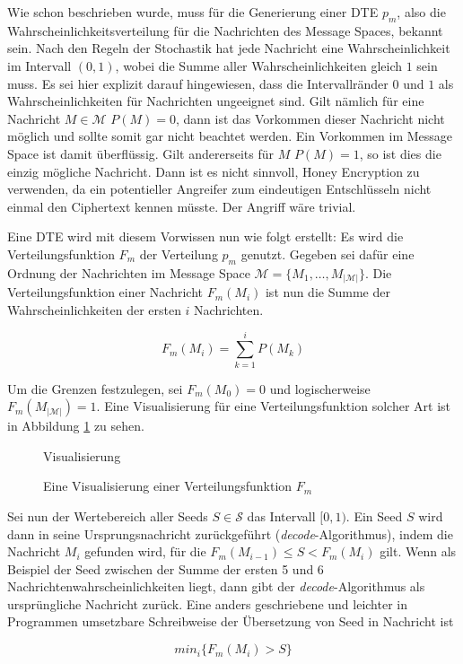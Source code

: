 Wie schon beschrieben wurde, muss für die Generierung einer DTE $p_m$, also die Wahrscheinlichkeitsverteilung für die Nachrichten des Message Spaces, bekannt sein. Nach den Regeln der Stochastik hat jede Nachricht eine Wahrscheinlichkeit im Intervall $(0,1)$, wobei die Summe aller Wahrscheinlichkeiten gleich $1$ sein muss. Es sei hier explizit darauf hingewiesen, dass die Intervallränder $0$ und $1$ als Wahrscheinlichkeiten für Nachrichten ungeeignet sind. Gilt nämlich für eine Nachricht $M \in \mathcal{M}$ $P(M) = 0$, dann ist das Vorkommen dieser Nachricht nicht möglich und sollte somit gar nicht beachtet werden. Ein Vorkommen im Message Space ist damit überflüssig. Gilt andererseits für $M$ $P(M) = 1$, so ist dies die einzig mögliche Nachricht. Dann ist es nicht sinnvoll, Honey Encryption zu verwenden, da ein potentieller Angreifer zum eindeutigen Entschlüsseln nicht einmal den Ciphertext kennen müsste. Der Angriff wäre trivial.

Eine DTE wird mit diesem Vorwissen nun wie folgt erstellt: Es wird die Verteilungsfunktion $F_m$ der Verteilung $p_m$ genutzt. Gegeben sei dafür eine Ordnung der Nachrichten im Message Space $\mathcal{M} = \{M_1, \dots, M_{|\mathcal{M}|}\}$. Die Verteilungsfunktion einer Nachricht $F_m(M_i)$ ist nun die Summe der Wahrscheinlichkeiten der ersten $i$ Nachrichten.

$$F_m(M_i) = \sum_{k = 1}^{i} P(M_k)$$

Um die Grenzen festzulegen, sei $F_m(M_0) = 0$ und logischerweise $F_m(M_{|\mathcal{M}|}) = 1$. Eine Visualisierung für eine Verteilungsfunktion solcher Art ist in Abbildung \ref{fig:Verteilungsfunktion} zu sehen.

\begin{figure}[!h]
Visualisierung
\caption{Eine Visualisierung einer Verteilungsfunktion $F_m$}
\label{fig:Verteilungsfunktion}
\end{figure}

Sei nun der Wertebereich aller Seeds $S \in \mathcal{S}$ das Intervall $[0,1)$. Ein Seed $S$ wird dann in seine Ursprungsnachricht zurückgeführt (\emph{decode}-Algorithmus), indem die Nachricht $M_i$ gefunden wird, für die $F_m(M_{i-1}) \leq S < F_m(M_i)$ gilt. Wenn als Beispiel der Seed zwischen der Summe der ersten 5 und 6 Nachrichtenwahrscheinlichkeiten liegt, dann gibt der \emph{decode}-Algorithmus als ursprüngliche Nachricht zurück. Eine anders geschriebene und leichter in Programmen umsetzbare Schreibweise der Übersetzung von Seed in Nachricht ist

$$min_i\{F_m(M_i) > S\}$$

